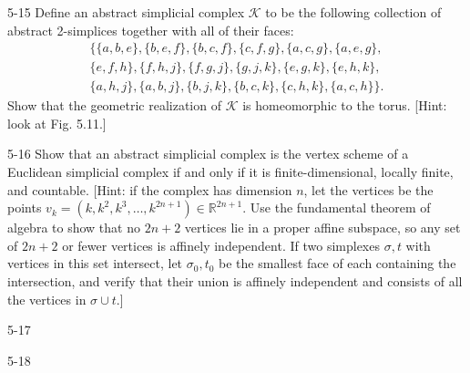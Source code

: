 \begin{problem}{5-15}\label{problem:5-15}
Define an abstract simplicial complex \( \mathcal{K} \) to be the following collection of abstract 2-simplices together with all of their faces:
\begin{multline*}
	\{ \{a, b, e\}, \{b, e, f\}, \{b, c, f\}, \{c, f, g\}, \{a, c, g\}, \{a, e, g\}, \\
	\{e, f, h\}, \{f, h, j\}, \{f, g, j\}, \{g, j, k\}, \{e, g, k\}, \{e, h, k\}, \\
	\{a, h, j\}, \{a, b, j\}, \{b, j, k\}, \{b, c, k\}, \{c, h, k\}, \{a, c, h\} \}.
\end{multline*}
Show that the geometric realization of \( \mathcal{K} \) is homeomorphic to the torus. [Hint: look at Fig. 5.11.]
\end{problem}

\begin{problem}{5-16}\label{problem:5-16}
Show that an abstract simplicial complex is the vertex scheme of a Euclidean simplicial complex if and only if it is finite-dimensional, locally finite, and countable. [Hint: if the complex has dimension \(n\), let the vertices be the points \( v_k = (k, k^2, k^3, \dots, k^{2n+1}) \in \mathbb{R}^{2n+1} \). Use the fundamental theorem of algebra to show that no \( 2n+2 \) vertices lie in a proper affine subspace, so any set of \( 2n+2 \) or fewer vertices is affinely independent. If two simplexes \( \sigma, t \) with vertices in this set intersect, let \( \sigma_{0}, t_{0} \) be the smallest face of each containing the intersection, and verify that their union is affinely independent and consists of all the vertices in \( \sigma \cup t \).]
\end{problem}

\begin{problem}{5-17}\label{problem:5-17}
\end{problem}

\begin{problem}{5-18}\label{problem:5-18}
\end{problem}
